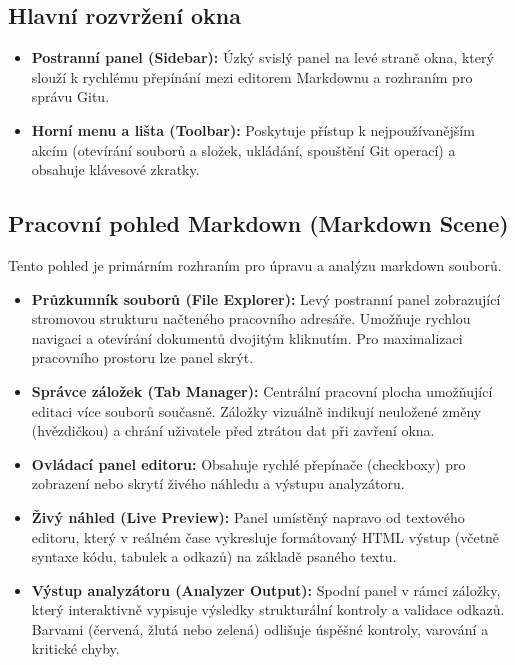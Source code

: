 \documentclass[12pt, a4paper]{article}
\begin{document}
\subsection{Hlavní rozvržení okna}
\begin{itemize}
    \item \textbf{Postranní panel (Sidebar):} Úzký svislý panel na levé straně okna, který slouží k rychlému přepínání mezi editorem Markdownu a rozhraním pro správu Gitu.
    \item \textbf{Horní menu a lišta (Toolbar):} Poskytuje přístup k nejpoužívanějším akcím (otevírání souborů a složek, ukládání, spouštění Git operací) a obsahuje klávesové zkratky.
\end{itemize}

\subsection{Pracovní pohled Markdown (Markdown Scene)}
Tento pohled je primárním rozhraním pro úpravu a analýzu markdown souborů.
\begin{itemize}
    \item \textbf{Průzkumník souborů (File Explorer):} Levý postranní panel zobrazující stromovou strukturu načteného pracovního adresáře. Umožňuje rychlou navigaci a otevírání dokumentů dvojitým kliknutím. Pro maximalizaci pracovního prostoru lze panel skrýt.
    \item \textbf{Správce záložek (Tab Manager):} Centrální pracovní plocha umožňující editaci více souborů současně. Záložky vizuálně indikují neuložené změny (hvězdičkou) a chrání uživatele před ztrátou dat při zavření okna.
    \item \textbf{Ovládací panel editoru:} Obsahuje rychlé přepínače (checkboxy) pro zobrazení nebo skrytí živého náhledu a výstupu analyzátoru.
    \item \textbf{Živý náhled (Live Preview):} Panel umístěný napravo od textového editoru, který v reálném čase vykresluje formátovaný HTML výstup (včetně syntaxe kódu, tabulek a odkazů) na základě psaného textu.
    \item \textbf{Výstup analyzátoru (Analyzer Output):} Spodní panel v rámci záložky, který interaktivně vypisuje výsledky strukturální kontroly a validace odkazů. Barvami (červená, žlutá nebo zelená) odlišuje úspěšné kontroly, varování a kritické chyby.
\end{itemize}
\end{document}
